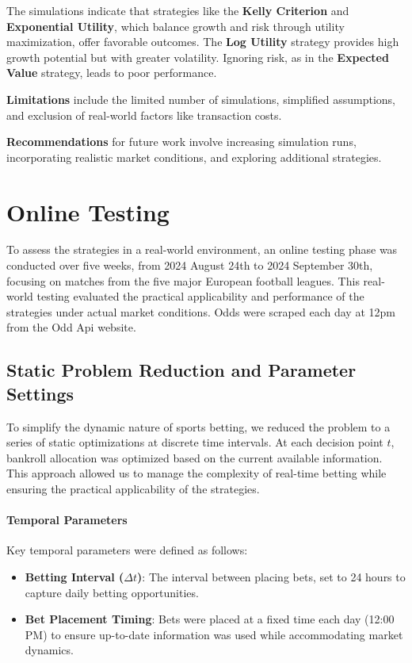 The simulations indicate that strategies like the \textbf{Kelly Criterion} and \textbf{Exponential Utility}, which balance growth and risk through utility maximization, offer favorable outcomes. The \textbf{Log Utility} strategy provides high growth potential but with greater volatility. Ignoring risk, as in the \textbf{Expected Value} strategy, leads to poor performance.

\textbf{Limitations} include the limited number of simulations, simplified assumptions, and exclusion of real-world factors like transaction costs.

\textbf{Recommendations} for future work involve increasing simulation runs, incorporating realistic market conditions, and exploring additional strategies.


\section{Online Testing}

To assess the strategies in a real-world environment, an online testing phase was conducted over five weeks, from 2024 August 24th to 2024 September 30th, focusing on matches from the five major European football leagues. This real-world testing evaluated the practical applicability and performance of the strategies under actual market conditions. Odds were scraped each day at 12pm from the Odd Api website.


\subsection{Static Problem Reduction and Parameter Settings}

To simplify the dynamic nature of sports betting, we reduced the problem to a series of static optimizations at discrete time intervals. At each decision point \( t \), bankroll allocation was optimized based on the current available information. This approach allowed us to manage the complexity of real-time betting while ensuring the practical applicability of the strategies.

\paragraph{Temporal Parameters}

Key temporal parameters were defined as follows:

\begin{itemize}
    \item \textbf{Betting Interval (\( \Delta t \))}: The interval between placing bets, set to 24 hours to capture daily betting opportunities.
    \item \textbf{Bet Placement Timing}: Bets were placed at a fixed time each day (12:00 PM) to ensure up-to-date information was used while accommodating market dynamics.
\end{itemize}

